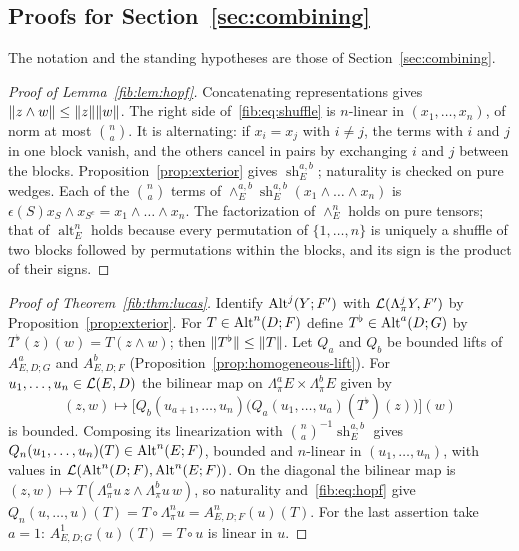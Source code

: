 \subsection{Proofs for Section~\ref{sec:combining}}\label{dfr:ssec:combining}

The notation and the standing hypotheses are those of Section~\ref{sec:combining}.

\begin{proof}[Proof of Lemma~\ref{fib:lem:hopf}]
Concatenating representations gives $\lVert z\wedge w\rVert\le\lVert z\rVert\lVert w\rVert$. The right side of~\eqref{fib:eq:shuffle} is
$n$\nobreakdash-linear in $(x_1,\dots,x_n)$, of norm at most $\binom na$. It is alternating: if $x_i=x_j$ with $i\ne j$,
the terms with $i$ and $j$ in one block vanish, and the others cancel in pairs by exchanging $i$ and $j$ between the
blocks. Proposition~\ref{prop:exterior} gives $\operatorname{sh}^{a,b}_E$; naturality is checked on pure wedges. Each of
the $\binom na$ terms of $\wedge^{a,b}_E\operatorname{sh}^{a,b}_E(x_1\wedge\dots\wedge x_n)$ is
$\epsilon(S)x_S\wedge x_{S^c}=x_1\wedge\dots\wedge x_n$. The factorization of $\wedge^n_E$ holds on pure tensors; that of
$\operatorname{alt}^n_E$ holds because every permutation of $\{1,\dots,n\}$ is uniquely a shuffle of two blocks followed
by permutations within the blocks, and its sign is the product of their signs.
\end{proof}

\begin{proof}[Proof of Theorem~\ref{fib:thm:lucas}]
Identify $\operatorname{Alt}^j(Y;F')$ with $\mathcal L(\Lambda^j_\pi Y,F')$ by Proposition~\ref{prop:exterior}. For $T\in\operatorname{Alt}^n(D;F)$
define $T^\flat\in\operatorname{Alt}^a(D;G)$ by $T^\flat(z)(w)=T(z\wedge w)$; then $\lVert T^\flat\rVert\le\lVert T\rVert$. Let $Q_a$ and $Q_b$ be
bounded lifts of $A^a_{E,D;G}$ and $A^b_{E,D;F}$ (Proposition~\ref{prop:homogeneous-lift}). For
$u_1,\dots,u_n\in\mathcal L(E,D)$ the bilinear map on $\Lambda^a_\pi E\times\Lambda^b_\pi E$ given by
\[
 (z,w)\longmapsto\bigl[Q_b(u_{a+1},\dots,u_n)\bigl(Q_a(u_1,\dots,u_a)(T^\flat)(z)\bigr)\bigr](w)
\]
is bounded. Composing its linearization with
$\binom na^{-1}\operatorname{sh}^{a,b}_E$ gives $Q_n(u_1,\dots,u_n)(T)\in\operatorname{Alt}^n(E;F)$, bounded and $n$\nobreakdash-linear
in $(u_1,\dots,u_n)$, with values in $\mathcal L(\operatorname{Alt}^n(D;F),\operatorname{Alt}^n(E;F))$. On the diagonal the bilinear map is
$(z,w)\mapsto T(\Lambda^a_\pi u\,z\wedge\Lambda^b_\pi u\,w)$, so naturality and~\eqref{fib:eq:hopf} give
$Q_n(u,\dots,u)(T)=T\circ\Lambda^n_\pi u=A^n_{E,D;F}(u)(T)$. For the last assertion take $a=1$:
$A^1_{E,D;G}(u)(T)=T\circ u$ is linear in $u$.
\end{proof}

